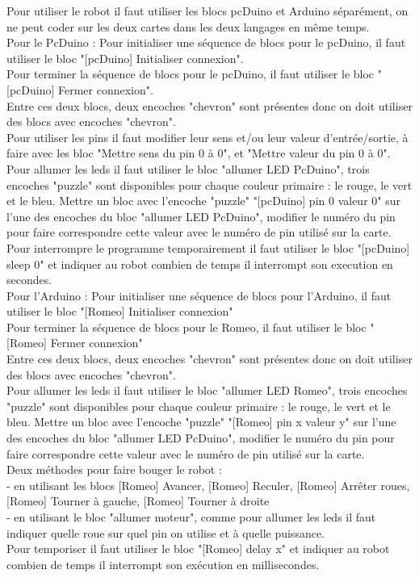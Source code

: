 \documentclass[12pt,francais]{report}
\begin{document}
Pour utiliser le robot il faut utiliser les blocs pcDuino et Arduino séparément, on ne peut coder sur les deux cartes dans les deux langages en même temps.\\


Pour le PcDuino :
Pour initialiser une séquence de blocs pour le pcDuino, il faut utiliser le bloc "[pcDuino] Initialiser connexion".\\
Pour terminer la séquence de blocs pour le pcDuino, il faut utiliser le bloc "[pcDuino] Fermer connexion".\\
Entre ces deux blocs, deux encoches "chevron" sont présentes donc on doit utiliser des blocs avec encoches "chevron".\\
Pour utiliser les pins il faut modifier leur sens et/ou leur valeur d'entrée/sortie, à faire avec les bloc "Mettre sens du pin 0 à 0", et "Mettre valeur du pin 0 à 0".\\
Pour allumer les leds il faut utiliser le bloc "allumer LED PcDuino", trois encoches "puzzle" sont disponibles pour chaque couleur primaire : le rouge, le vert et le bleu. Mettre un bloc avec l'encoche "puzzle" "[pcDuino] pin 0 valeur 0" sur l'une des encoches du bloc "allumer LED PcDuino", modifier le numéro du pin pour faire correspondre cette valeur avec le numéro de pin utilisé sur la carte. \\
Pour interrompre le programme temporairement il faut utiliser le bloc "[pcDuino] sleep 0" et indiquer au robot combien de temps il interrompt son execution en secondes.\\



Pour l'Arduino :
Pour initialiser une séquence de blocs pour l'Arduino, il faut utiliser le bloc "[Romeo] Initialiser connexion"\\
Pour terminer la séquence de blocs pour le Romeo, il faut utiliser le bloc "[Romeo] Fermer connexion"\\
Entre ces deux blocs, deux encoches "chevron" sont présentes donc on doit utiliser des blocs avec encoches "chevron".\\
Pour allumer les leds il faut utiliser le bloc "allumer LED Romeo", trois encoches "puzzle" sont disponibles pour chaque couleur primaire : le rouge, le vert et le bleu. Mettre un bloc avec l'encoche "puzzle" "[Romeo] pin x valeur y" sur l'une des encoches du bloc "allumer LED PcDuino", modifier le numéro du pin pour faire correspondre cette valeur avec le numéro de pin utilisé sur la carte.\\
Deux méthodes pour faire bouger le robot :\\
 - en utilisant les blocs [Romeo] Avancer, [Romeo] Reculer, [Romeo] Arrêter roues, [Romeo] Tourner à gauche, [Romeo] Tourner à droite\\
 - en utilisant le bloc "allumer moteur", comme pour allumer les leds il faut indiquer quelle roue sur quel pin on utilise et à quelle puissance.\\
Pour temporiser il faut utiliser le bloc "[Romeo] delay x" et indiquer au robot combien de temps il interrompt son exécution en millisecondes.\\
\end{document}
